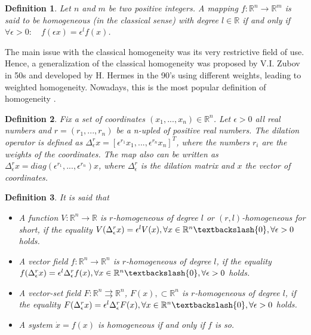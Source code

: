 \documentclass[11pt,letterpaper,twoside,openright]{report}
\newcommand{\RE}{\mathbb{R}}
\newtheorem{definition}{Definition}[chapter]
\begin{document}
\begin{definition}
	Let $n$ and $m$ be two positive integers. A mapping $f: \RE^n \rightarrow \RE^m$ is said to be homogeneous (in the classical sense) with degree $l \in \RE$ if and only if $\forall \epsilon>0: \quad f(\epsilon x) = \epsilon^lf(x)$.
\end{definition}

The main issue with the classical homogeneity was its very restrictive field of use. Hence, a generalization of the classical homogeneity was proposed by V.I. Zubov in 50s and developed by H. Hermes in the 90’s using different weights, leading to weighted homogeneity. Nowadays, this is the most popular definition of homogeneity \cite{Bernuau2014}.

\begin{definition}
	Fix a set of coordinates $(x_1,...,x_n)\in \RE^n$. Let $\epsilon>0$ all real numbers and $r=(r_1,...,r_n)$ be a n-upled of positive real numbers. The dilation operator is defined as $\Delta_{\epsilon}^{r}x = \left[ \epsilon^{r_1}x_1,...,\epsilon^{r_n}x_n \right]^T$, where the numbers $r_i$ are the weights of the coordinates. The map also can be written as $\Delta_{\epsilon}^{r}x = diag(\epsilon^{r_1},...,\epsilon^{r_n})x$, where $\Delta_{\epsilon}^{r}$ is the dilation matrix and $x$ the vector of coordinates.
\end{definition}

\begin{definition}
	It is said that
	\begin{itemize} 
		\item A function $V: \RE^n \rightarrow \RE$ is $r$-homogeneous of degree $l$ or $(r,l)$-homogeneous for short, if the equality $V(\Delta_{\epsilon}^{r}x) = \epsilon^lV(x), \forall x\in \RE^n  \textbackslash \{0 \}, \forall \epsilon >0$ holds.
		\item A vector field $f: \RE^n \rightarrow \RE^n$ is $r$-homogeneous of degree $l$, if the equality $f(\Delta_{\epsilon}^{r}x) = \epsilon^l \Delta_{\epsilon}^{r} f(x), \forall x\in \RE^n  \textbackslash \{0 \}, \forall \epsilon >0$ holds.
		\item A vector-set field $F: \RE^n \rightrightarrows\RE^n$, $F(x), \subset \RE^n$ is $r$-homogeneous of degree $l$, if the equality $F(\Delta_{\epsilon}^{r}x) = \epsilon^l \Delta_{\epsilon}^{r} F(x), \forall x\in \RE^n  \textbackslash \{0 \}, \forall \epsilon >0$ holds.
		\item A system $\dot{x} = f(x)$ is homogeneous if and only if $f$ is so.
	\end{itemize}
\end{definition}
\end{document}
